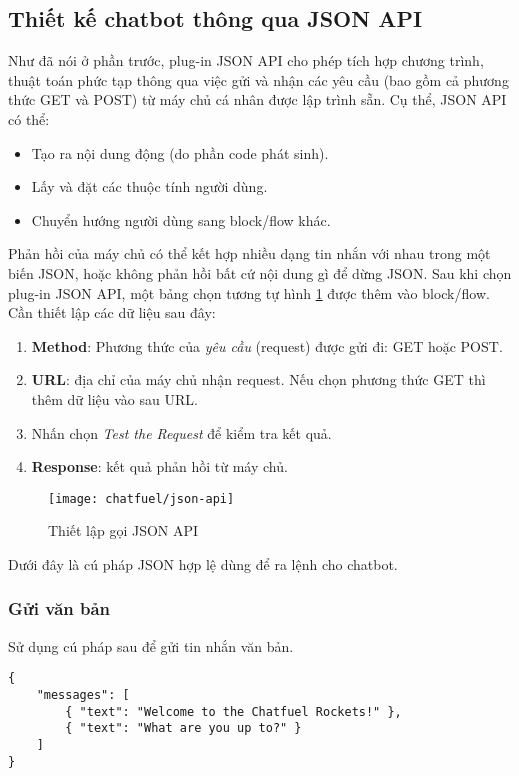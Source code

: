 \subsection{Thiết kế chatbot thông qua JSON API}
Như đã nói ở phần trước, plug-in JSON API cho phép tích hợp chương trình, thuật toán phức tạp thông qua việc gửi và nhận các yêu cầu (bao gồm cả phương thức GET và POST) từ máy chủ cá nhân được lập trình sẵn. Cụ thể, JSON API có thể:\begin{itemize}
	\item Tạo ra nội dung động (do phần code phát sinh).
	\item Lấy và đặt các thuộc tính người dùng.
	\item Chuyển hướng người dùng sang block/flow khác.
\end{itemize}\par
Phản hồi của máy chủ có thể kết hợp nhiều dạng tin nhắn với nhau trong một biến JSON, hoặc không phản hồi bất cứ nội dung gì để dừng JSON. Sau khi chọn plug-in JSON API, một bảng chọn tương tự hình \ref{fig:fig-c3-json-api} được thêm vào block/flow. Cần thiết lập các dữ liệu sau đây: \begin{enumerate}[label=\textbf{(\arabic*)},align=left,left=0cm..0cm,itemindent=*]
	\item \textbf{Method}: Phương thức của \textit{yêu cầu} (request) được gửi đi: GET hoặc POST.
	\item \textbf{URL}: địa chỉ của máy chủ nhận request. Nếu chọn phương thức GET thì thêm dữ liệu vào sau URL.
	\item Nhấn chọn \textit{Test the Request} để kiểm tra kết quả.
	\item \textbf{Response}: kết quả phản hồi từ máy chủ.
\end{enumerate}\par

\begin{figure}[htb!]\centering
	\texttt{[image: chatfuel/json-api]}
	\caption{Thiết lập gọi JSON API}
	\label{fig:fig-c3-json-api}
\end{figure}\par

Dưới đây là cú pháp JSON hợp lệ dùng để ra lệnh cho chatbot.
\subsubsection{Gửi văn bản}
Sử dụng cú pháp sau để gửi tin nhắn văn bản.
\begin{lstlisting}
{
	"messages": [
		{ "text": "Welcome to the Chatfuel Rockets!" },
		{ "text": "What are you up to?" }
	]
}
\end{lstlisting}\par

